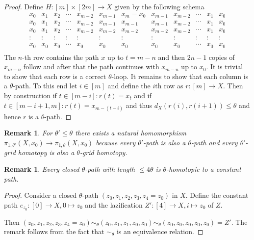 \documentclass[a4paper, 11pt, twoside]{article}
\theoremstyle{break}
\theoremstyle{break}
\newtheorem{rem}[thm]{Remark}
\begin{document}
\begin{proof}
  Define $H\colon [m] \times [2m] \to X$ given by the following schema
  \begin{equation*}
    \begin{matrix}
      x_0 & x_1 & x_2 & \cdots & x_{m-2} & x_{m-1} & x_m = x_0 & x_{m-1} & x_{m-2} & \cdots & x_1 & x_0 \\
      x_0 & x_1 & x_2 & \cdots & x_{m-2} & x_{m-1} & x_{m-1} & x_{m-1} & x_{m-2} & \cdots & x_1 & x_0 \\
      x_0 & x_1 & x_2 & \cdots & x_{m-2} & x_{m-2} & x_{m-2} & x_{m-2} & x_{m-2} & \cdots & x_1 & x_0 \\
      \vdots & \vdots & \vdots & \vdots & \vdots & \vdots & \vdots & \vdots & \vdots & \vdots & \vdots & \vdots \\
      x_0 & x_0 & x_0 & \cdots & x_0 & x_0 & x_0 & x_0 & x_0 & \cdots & x_0 & x_0 \\
    \end{matrix}
  \end{equation*}
  The $n$-th row contains the path $x$ up to $t = m-n$ and then $2n-1$ copies of $x_{m-n}$ follow and after that the path continues with $x_{m-n}$ up to $x_0$.
  It is trivial to show that each row is a correct $\theta$-loop. It remains to show that each column is a $\theta$-path. To this end let $i \in [m]$ and define the $i$th row as $r\colon [m] \to X$.
  Then by construction if $t \in [m-i]\colon r(t) = x_t$ and if $t \in [m-i+1, m]\colon r(t) = x_{m-(t-i)}$ 
  and thus $d_X(r(i), r(i+1)) \leq \theta$ and hence $r$ is a $\theta$-path.
\end{proof}

\begin{rem}
  For $\theta' \leq \theta$ there exists a natural homomorphism $\pi_{1,\theta'}(X, x_0) \to \pi_{1,\theta}(X, x_0)$ 
  because every $\theta'$-path is also a $\theta$-path and every $\theta'$-grid homotopy is also a $\theta$-grid homotopy.
\end{rem}

\begin{rem}
  Every closed $\theta$-path with length $\leq 4\theta$ is $\theta$-homotopic to a constant path.

  \cite[p. 4]{vigolo2018fundamental}
\end{rem}

\begin{proof}
  Consider a closed $\theta$-path $(z_0, z_1, z_2, z_3, z_4 = z_0)$ in $X$. 
  Define the constant path $e_{z_0}\colon [0] \to X, 0 \mapsto z_0$ and the lazification $Z': [4] \to X, i \mapsto z_0$ of $Z$.

  Then $(z_0, z_1, z_2, z_3, z_4 = z_0) \sim_{\theta} (z_0, z_1, z_1, z_0, z_0)\sim_{\theta} (z_0, z_0, z_0, z_0, z_0) = Z'$. The remark follows from the fact that $\sim_{\theta}$ is an equivalence relation.
\end{proof}
\end{document}
